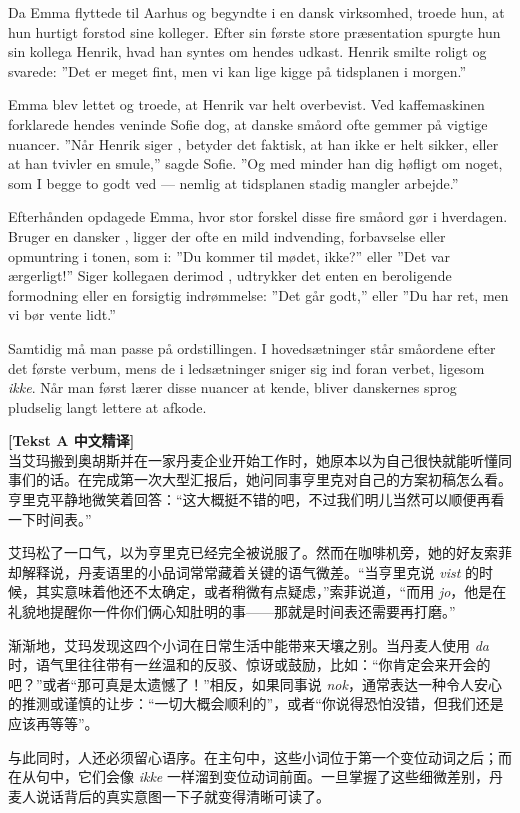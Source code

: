 Da Emma flyttede til Aarhus og begyndte i en dansk virksomhed, troede hun, at hun hurtigt forstod sine kolleger. Efter sin første store præsentation spurgte hun sin kollega Henrik, hvad han syntes om hendes udkast. Henrik smilte roligt og svarede: ”Det er  meget fint, men vi kan  lige kigge på tidsplanen i morgen.”

Emma blev lettet og troede, at Henrik var helt overbevist. Ved kaffemaskinen forklarede hendes veninde Sofie dog, at danske småord ofte gemmer på vigtige nuancer. ”Når Henrik siger , betyder det faktisk, at han ikke er helt sikker, eller at han tvivler en smule,” sagde Sofie. ”Og med  minder han dig høfligt om noget, som I begge to godt ved --- nemlig at tidsplanen stadig mangler arbejde.”

Efterhånden opdagede Emma, hvor stor forskel disse fire småord gør i hverdagen. Bruger en dansker , ligger der ofte en mild indvending, forbavselse eller opmuntring i tonen, som i: ”Du kommer  til mødet, ikke?” eller ”Det var  ærgerligt!” Siger kollegaen derimod , udtrykker det enten en beroligende formodning eller en forsigtig indrømmelse: ”Det går  godt,” eller ”Du har  ret, men vi bør vente lidt.”

Samtidig må man passe på ordstillingen. I hovedsætninger står småordene efter det første verbum, mens de i ledsætninger sniger sig ind foran verbet, ligesom \textit{ikke}. Når man først lærer disse nuancer at kende, bliver danskernes sprog pludselig langt lettere at afkode.

\begin{transbox}
\small
\textbf{\color{NCDTeal}[Tekst A 中文精译]}\\
当艾玛搬到奥胡斯并在一家丹麦企业开始工作时，她原本以为自己很快就能听懂同事们的话。在完成第一次大型汇报后，她问同事亨里克对自己的方案初稿怎么看。亨里克平静地微笑着回答：“这大概挺不错的吧，不过我们明儿当然可以顺便再看一下时间表。”

艾玛松了一口气，以为亨里克已经完全被说服了。然而在咖啡机旁，她的好友索菲却解释说，丹麦语里的小品词常常藏着关键的语气微差。“当亨里克说 \textit{vist} 的时候，其实意味着他还不太确定，或者稍微有点疑虑，”索菲说道，“而用 \textit{jo}，他是在礼貌地提醒你一件你们俩心知肚明的事——那就是时间表还需要再打磨。”

渐渐地，艾玛发现这四个小词在日常生活中能带来天壤之别。当丹麦人使用 \textit{da} 时，语气里往往带有一丝温和的反驳、惊讶或鼓励，比如：“你肯定会来开会的吧？”或者“那可真是太遗憾了！”相反，如果同事说 \textit{nok}，通常表达一种令人安心的推测或谨慎的让步：“一切大概会顺利的”，或者“你说得恐怕没错，但我们还是应该再等等”。

与此同时，人还必须留心语序。在主句中，这些小词位于第一个变位动词之后；而在从句中，它们会像 \textit{ikke} 一样溜到变位动词前面。一旦掌握了这些细微差别，丹麦人说话背后的真实意图一下子就变得清晰可读了。
\end{transbox}

